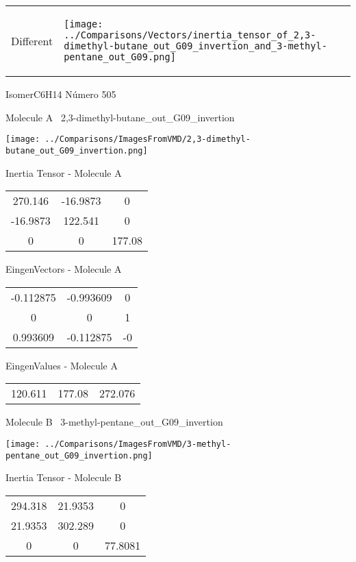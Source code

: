 \vtab[-5mm]
\begin{tabular}{*{2}{m{}}}
\begin{center}
\textcolor{NavyBlue}{\Large Different}
\end{center}
&
\begin{center}
\texttt{[image: ../Comparisons/Vectors/inertia\_tensor\_of\_2,3-dimethyl-butane\_out\_G09\_invertion\_and\_3-methyl-pentane\_out\_G09.png]}
\end{center}
\end{tabular}

 \newpage

\vtab[-3cm]
\begin{center}
{\large IsomerC6H14 \tab Número 505}
\end{center}
\begin{multicols}{2}
\begin{center}

Molecule A \
2,3-dimethyl-butane\_out\_G09\_invertion

\texttt{[image: ../Comparisons/ImagesFromVMD/2,3-dimethyl-butane\_out\_G09\_invertion.png]}

Inertia Tensor - Molecule A \\
\begin{tabular}{|c c c|}
270.146	 & 	-16.9873	 & 	0	 \\
-16.9873	 & 	122.541	 & 	0	 \\
0	 & 	0	 & 	177.08
\end{tabular}

\vtab
 EingenVectors - Molecule A     \\
\begin{tabular}{|c c c|}
-0.112875	 & 	-0.993609	 & 	0	 \\
0	 & 	0	 & 	1	 \\
0.993609	 & 	-0.112875	 & 	-0
\end{tabular}

\vtab
 EingenValues - Molecule A     \\
\begin{tabular}{|c c c|}
120.611	 & 	177.08	 & 	272.076	 \\
\end{tabular}
\columnbreak

Molecule B \
3-methyl-pentane\_out\_G09\_invertion

\texttt{[image: ../Comparisons/ImagesFromVMD/3-methyl-pentane\_out\_G09\_invertion.png]}

Inertia Tensor - Molecule B \\
\begin{tabular}{|c c c|}
294.318	 & 	21.9353	 & 	0	 \\
21.9353	 & 	302.289	 & 	0	 \\
0	 & 	0	 & 	77.8081
\end{tabular}


\end{center}
\end{multicols}
